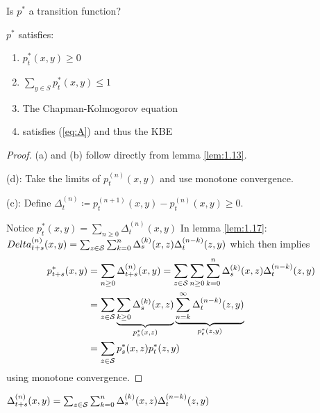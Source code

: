  Is \(p^*\) a transition function?

\begin{theorem}\label{thm:1.15}
    \(p^*\) satisfies:
    \begin{enumerate}
        \item[(a)] \(p_t^*(x,y)\geq 0\) 
        \item[(b)] \(\sum_{y\in S}p_t^*(x,y)\leq 1\)
        \item[(c)] The Chapman-Kolmogorov equation 
        \item[(d)] satisfies (\ref{eq:A}) and thus the KBE
    \end{enumerate}
\end{theorem}

\begin{proof}
    (a) and (b) follow directly from lemma \ref{lem:1.13}.

    (d): Take the limits of \(p_t^{(n)}(x,y)\) and use monotone convergence.

    (c): Define \(\Delta_t^{(n)}\coloneqq p_t^{(n+1)}(x,y)-p_t^{(n)}(x,y)\geq 0\).

    Notice \(p_t^*(x,y)=\sum_{n\geq 0} \Delta_t^{(n)}(x,y)\) In lemma \ref{lem:1.17}:
     \(Delta_{t+s}^{(n)}(x,y)=\sum_{z\in\mathcal{S}}\sum_{k=0}^n\Delta_s^{(k)}(x,z)\Delta_t^{(n-k)}(z,y)\)
     which then implies 
    \begin{align*}
        p_{t+s}^*(x,y)&=\sum_{n\geq 0}\Delta_{t+s}^{(n)}(x,y)=\sum_{z\in\mathcal{S}}\sum_{n\geq 0}\sum_{k=0}^{n}\Delta_s^{(k)}(x,z)\Delta_t^{(n-k)}(z,y)\\
        &=\sum_{z\in\mathcal{S}}\underbrace{\sum_{k\geq 0}\Delta_s^{(k)}(x,z)}_{p_s^*(x,z)}\underbrace{\sum_{n=k}^\infty \Delta_{t}^{(n-k)}(z,y)}_{p_t^*(z,y)}\\
        &=\sum_{z\in\mathcal{S}} p_s^*(x,z)p_t^*(z,y)
    \end{align*}
    using monotone convergence.
\end{proof}

\begin{lemma}\label{lem:1.17}
    \(\Delta_{t+s}^{(n)}(x,y)=\sum_{z\in\mathcal{S}}\sum_{k=0}^n\Delta_s^{(k)}(x,z)\Delta_t^{(n-k)}(z,y)\)
\end{lemma}

